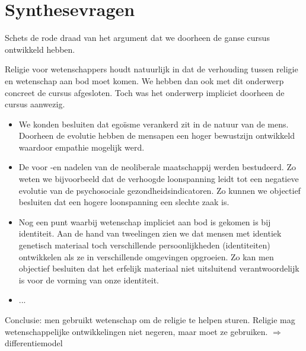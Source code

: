 \documentclass[main.tex]{subfiles}
\begin{document}
\section{Synthesevragen}


\begin{examenvraag}
    \begin{vraag}
        Schets de rode draad van het argument dat we doorheen de ganse cursus ontwikkeld hebben.
    \end{vraag}

    \begin{antwoord}
	    Religie voor wetenschappers houdt natuurlijk in dat de verhouding tussen religie en
	    wetenschap aan bod moet komen. We hebben dan ook met dit onderwerp concreet de cursus
	    afgesloten. Toch was het onderwerp impliciet doorheen de cursus aanwezig.
	    \begin{itemize}
	    	\item We konden besluiten dat egoïsme  verankerd zit in de natuur van de mens. Doorheen de evolutie hebben de mensapen een hoger bewustzijn ontwikkeld waardoor empathie mogelijk werd.
	    	\item De voor -en nadelen van de neoliberale maatschappij werden bestudeerd.
	    		    Zo weten we bijvoorbeeld dat de verhoogde loonspanning leidt tot een negatieve evolutie van de psychosociale gezondheidsindicatoren. Zo kunnen we objectief besluiten dat een hogere loonspanning
	    		    een slechte zaak is.
	   		\item Nog een punt waarbij wetenschap impliciet aan bod is gekomen is bij identiteit.
	   			    Aan de hand van tweelingen zien we dat mensen met identiek genetisch materiaal
	   			    toch verschillende persoonlijkheden (identiteiten) ontwikkelen als ze in verschillende omgevingen
	   			    opgroeien. Zo kan men objectief besluiten dat het erfelijk materiaal niet uitsluitend
	   			    verantwoordelijk
	   			    is voor de vorming van onze identiteit.
	   		\item ...
	    \end{itemize}
	    Conclusie: men gebruikt wetenschap om de religie te helpen sturen. Religie mag
	    wetenschappelijke
	    ontwikkelingen niet negeren, maar moet ze gebruiken. $\Rightarrow$ differentiemodel
    \end{antwoord}
\end{examenvraag}
\end{document}
